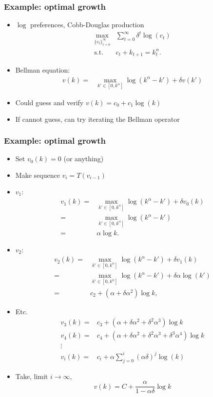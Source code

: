 \documentclass[compress]{beamer}
\renewcommand{\to}{{\rightarrow}}
\begin{document}
\begin{frame}
  \frametitle{Example: optimal growth}
  \begin{itemize}
  \item $\log$ preferences, Cobb-Douglas production
    \begin{align*}
      \max_{\{c_t\}_{t=0}^\infty} & \sum_{t=0}^\infty \delta^t
      \log(c_t) \\
      \text{s.t. } & c_t + k_{t+1} = k_t^\alpha.
    \end{align*}
  \item Bellman equation:
    \begin{align*}
      v(k) = & \max_{k' \in [0,k^\alpha]} \log(k^\alpha - k') + \delta
      v(k')
    \end{align*}
  \item Could guess and verify $v(k) = c_0 + c_1 \log(k)$
  \item If cannot guess, can try iterating the Bellman operator
  \end{itemize}
\end{frame}

\begin{frame}[allowframebreaks]
  \frametitle{Example: optimal growth}
  \begin{itemize}
  \item Set $v_0(k) = 0$ (or anything)
  \item Make sequence $ v_i = T(v_{i-1})$
  \item $v_1$:
    \begin{align*}
      v_1(k) = & \max_{k' \in [0,k^\alpha]} \log(k^\alpha - k') + \delta v_0(k)
      \\
      = & \max_{k' \in [0,k^\alpha]} \log(k^\alpha - k') \\
      = & \alpha \log k.
    \end{align*}
  \item $v_2$: 
    \begin{align*}
      v_2(k) = & \max_{k' \in [0,k^\alpha]} \log(k^\alpha - k') + \delta v_1(k)
      \\
      = & \max_{k' \in [0,k^\alpha]} \log(k^\alpha - k') + \delta
      \alpha \log(k')  \\
      = & c_2 + (\alpha + \delta \alpha^2) \log k,
    \end{align*}
  \item Etc.
    \begin{align*}
      v_3(k) = & c_3 + (\alpha + \delta \alpha^2 + \delta^2 \alpha^3)
      \log k \\
      v_4(k) = & c_4 + (\alpha + \delta \alpha^2 + \delta^2 \alpha^3 +
      \delta^3 \alpha^4) \log k \\
      \vdots &  \\
      v_i(k) = & c_i + \alpha \sum_{j = 0}^i (\alpha \delta)^j \log(k)
    \end{align*}
  \item Take, limit $i \to \infty$, 
    \[
      v(k) = 
      C + \frac{\alpha}{1-\alpha \delta} \log k 
      \]      
  \end{itemize}  
\end{frame}
\end{document}
